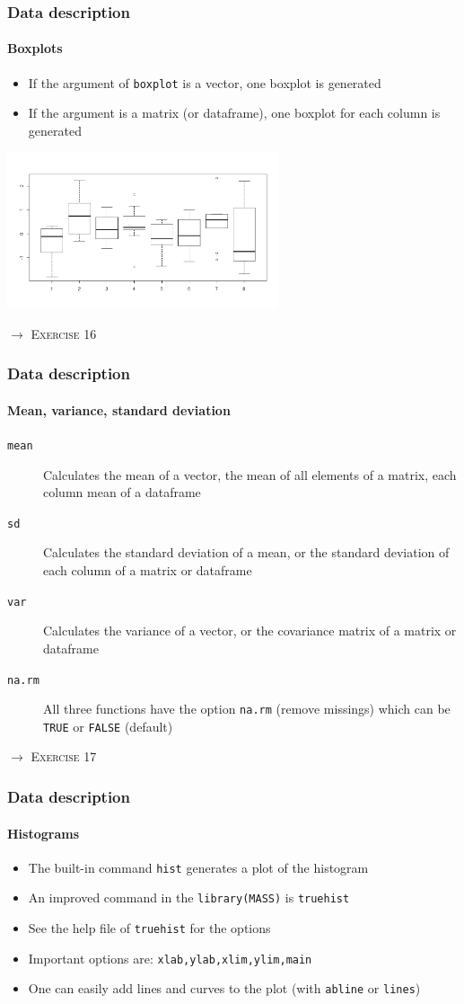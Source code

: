 \documentclass[title={Introduction to R}, author={Mutschler and Zaharieva}, inst={Institute for Econometrics and Empirical Economics}]{beamer}
\begin{document}
\begin{frame}
\frametitle{Data description}
\framesubtitle{Boxplots}
\begin{itemize}
\item If the argument of \texttt{boxplot} is a vector, one boxplot is generated
\item If the argument is a matrix (or dataframe), one boxplot for each
column is generated
\end{itemize}
\begin{center}
\includegraphics[width=8cm]{boxplot.jpeg}
\end{center}
\vspace*{-1cm}\pause
$\longrightarrow $ \textsc{Exercise 16}
\end{frame}


\begin{frame}
\frametitle{Data description}
\framesubtitle{Mean, variance, standard deviation}
\begin{description}
\item[\texttt{mean}] Calculates the mean of a vector, the mean of all
elements of a matrix, each column mean of a dataframe
\item[\texttt{sd}] Calculates the standard deviation of a mean, or the
standard deviation of each column of a matrix or dataframe
\item[\texttt{var}] Calculates the variance of a vector, or the covariance
matrix of a matrix or dataframe
\item[\texttt{na.rm}] All three functions have the option \texttt{na.rm}
(remove missings) which can be \texttt{TRUE} or \texttt{FALSE} (default)
\end{description}\pause
$\longrightarrow $ \textsc{Exercise 17}
\end{frame}


\begin{frame}
\frametitle{Data description}
\framesubtitle{Histograms}
\begin{itemize}
\item The built-in command \texttt{hist} generates a plot of the histogram
\item An improved command in the \texttt{library(MASS)} is \texttt{truehist}
\item See the help file of \texttt{truehist} for the options
\item Important options are: \texttt{xlab,ylab,xlim,ylim,main}
\item One can easily add lines and curves to the plot\newline
(with \texttt{abline} or \texttt{lines})
\end{itemize}
\end{frame}
\end{document}
